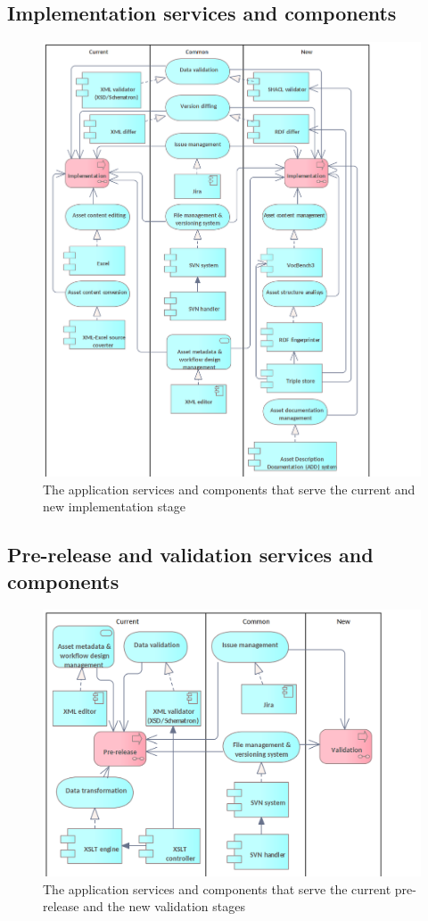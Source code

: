	\subsection{Implementation services and components}
	\label{sec:implementation-application}	
	\begin{figure}[h]
		\centering
		\includegraphics[width=.9\textwidth]{images/application/Implementation v3.png}
		\caption{The application services and components that serve the current and new implementation stage}
		\label{fig:application-implementation}
	\end{figure}
	
	\subsection{Pre-release and validation services and components}
	\label{sec:validation-application}
	\begin{figure}[h]
		\centering
		\includegraphics[width=.9\textwidth]{images/application/Validation & Pre-release v3.png}
		\caption{The application services and components that serve the current pre-release and the new validation stages}
		\label{fig:application-validation}
	\end{figure}

